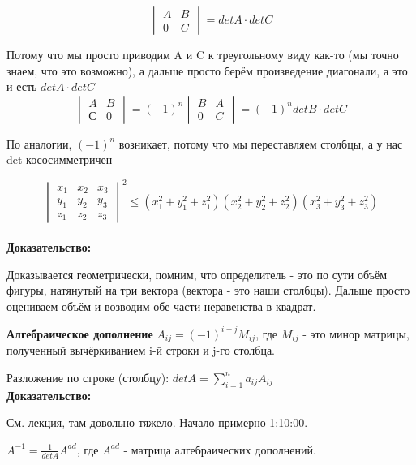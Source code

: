 \documentclass[12pt]{article}
\begin{document}
\begin{remarkbox}
    \[
    \begin{vmatrix}
        A & B\\
        0 & C
    \end{vmatrix}
    = detA \cdot detC\]

    Потому что мы просто приводим A и C к треугольному виду как-то (мы точно знаем, что это возможно), а дальше просто берём произведение диагонали, а это и есть $detA \cdot detC$\\

    \[
    \begin{vmatrix}
        A & B\\
        С & 0
    \end{vmatrix}
    = (-1)^n
    \begin{vmatrix}
        B & A\\
        0 & C
    \end{vmatrix}
    = (-1)^n detB \cdot detC\]

    По аналогии, $(-1)^n$ возникает, потому что мы переставляем столбцы, а у нас det кососимметричен
\end{remarkbox}

\begin{theorembox}
    \[
    \begin{vmatrix}
        x_1 & x_2 & x_3\\
        y_1 & y_2 & y_3\\
        z_1 & z_2 & z_3
    \end{vmatrix}^2
    \leq (x_1^2 + y_1^2 + z_1^2)(x_2^2 + y_2^2 + z_2^2)(x_3^2 + y_3^2 + z_3^2)\]\\

    \textbf{Доказательство:}

    Доказывается геометрически, помним, что определитель - это по сути объём фигуры, натянутый на три вектора (вектора - это наши столбцы). Дальше просто оцениваем объём и возводим обе части неравенства в квадрат.
\end{theorembox}

\begin{definitionbox}
    \textbf{Алгебраическое дополнение} $A_{ij} = (-1)^{i + j} M_{ij}$, где $ M_{ij}$ - это минор матрицы, полученный вычёркиванием i-й строки и j-го столбца.
\end{definitionbox}

\begin{theorembox}
    Разложение по строке (столбцу): $detA = \sum_{i = 1}^n a_{ij} A_{ij}$\\

    \textbf{Доказательство:}
    
    См. лекция, там довольно тяжело. Начало примерно 1:10:00.
    
\end{theorembox}

\begin{theorembox}
    $A^{-1} = \frac{1}{detA} A^{ad}$, где $A^{ad}$ - матрица алгебраических дополнений.
\end{theorembox}
\end{document}

